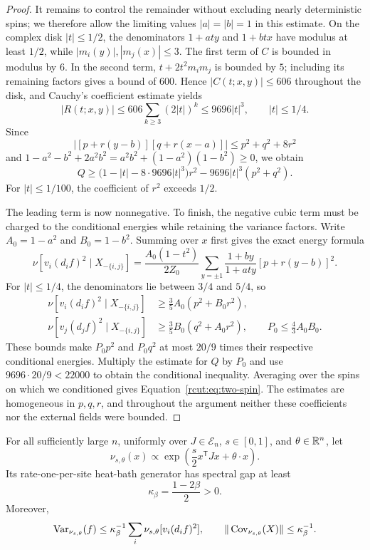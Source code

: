 \begin{proof}
It remains to control the remainder without excluding nearly
deterministic spins; we therefore allow the limiting values $|a|=|b|=1$
in this estimate.  On the complex disk $|t|\le1/2$, the denominators
$1+aty$ and $1+btx$ have modulus at least $1/2$, while
$|m_i(y)|,|m_j(x)|\le3$.  The first term of $C$ is bounded in modulus
by $6$.  In the second term, $t+2t^2m_i m_j$ is bounded by $5$;
including its remaining factors gives a bound of $600$.
Hence $|C(t;x,y)|\le606$ throughout the disk, and Cauchy's coefficient
estimate yields
\[
 |R(t;x,y)|\le606\sum_{k\ge3}(2|t|)^k
 \le9696|t|^3,\qquad |t|\le1/4.
\]
Since
\[
 |[p+r(y-b)][q+r(x-a)]|\le p^2+q^2+8r^2
\]
and $1-a^2-b^2+2a^2b^2=a^2b^2+(1-a^2)(1-b^2)\ge0$, we obtain
\[
 Q\ge\bigl(1-|t|-8\cdot9696|t|^3\bigr)r^2
          -9696|t|^3(p^2+q^2).
\]
For $|t|\le1/100$, the coefficient of $r^2$ exceeds $1/2$.

The leading term is now nonnegative.  To finish, the negative cubic term
must be charged to the conditional energies while retaining the variance
factors.  Write $A_0=1-a^2$ and $B_0=1-b^2$.  Summing over $x$ first
gives the exact energy formula
\[
 \nu[v_i(d_i f)^2\mid X_{-\{i,j\}}]
 =\frac{A_0(1-t^2)}{2Z_0}
   \sum_{y=\pm1}\frac{1+by}{1+aty}[p+r(y-b)]^2.
\]
For $|t|\le1/4$, the denominators lie between $3/4$ and $5/4$, so
\begin{align*}
 \nu[v_i(d_i f)^2\mid X_{-\{i,j\}}]
 &\ge\frac35 A_0(p^2+B_0r^2),\\
 \nu[v_j(d_j f)^2\mid X_{-\{i,j\}}]
 &\ge\frac35 B_0(q^2+A_0r^2),\qquad
 P_0\le\frac43A_0B_0.
\end{align*}
These bounds make $P_0p^2$ and $P_0q^2$ at most $20/9$ times their
respective conditional energies.  Multiply the estimate for $Q$ by
$P_0$ and use $9696\cdot20/9<22000$ to obtain the conditional
inequality.  Averaging over the spins on which we conditioned gives
Equation~\eqref{rcut:eq:two-spin}.  The estimates are homogeneous in
$p,q,r$, and throughout the argument neither these coefficients nor
the external fields were bounded.
\end{proof}

\begin{proposition}
\label{rcut:prop:uniform-gap}
For all sufficiently large $n$, uniformly over $J\in\mathcal E_n$,
$s\in[0,1]$, and $\theta\in\mathbb R^n$, let
\[
 \nu_{s,\theta}(x)\propto
 \exp\left(\frac s2x^{\mathsf T}Jx+\theta\cdot x\right).
\]
Its rate-one-per-site heat-bath generator has spectral gap at least
\[
 \kappa_\beta=\frac{1-2\beta}{2}>0.
\]
Moreover,
\begin{equation}
 \operatorname{Var}_{\nu_{s,\theta}}(f)
 \le\kappa_\beta^{-1}\sum_i
       \nu_{s,\theta}[v_i(d_i f)^2],
 \qquad
 \|\operatorname{Cov}_{\nu_{s,\theta}}(X)\|\le\kappa_\beta^{-1}.
 \label{rcut:eq:uniform-gap-covariance}
\end{equation}
\end{proposition}

